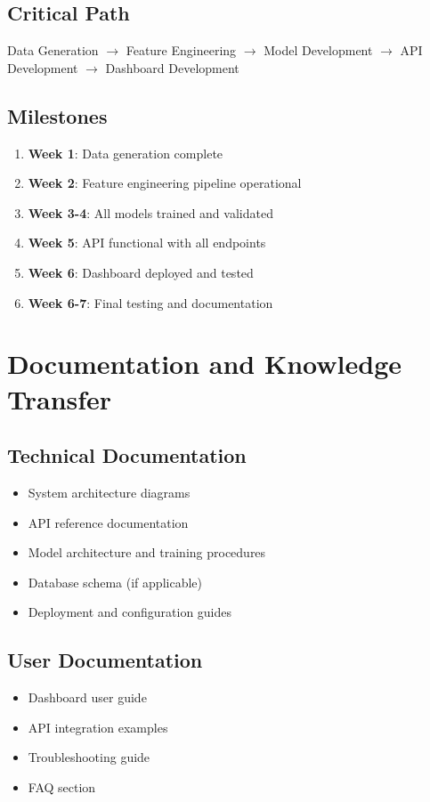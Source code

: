 \documentclass[12pt,a4paper]{article}
\begin{document}
\subsection{Critical Path}
Data Generation $\rightarrow$ Feature Engineering $\rightarrow$ Model Development $\rightarrow$ API Development $\rightarrow$ Dashboard Development

\subsection{Milestones}
\begin{enumerate}
    \item \textbf{Week 1}: Data generation complete
    \item \textbf{Week 2}: Feature engineering pipeline operational
    \item \textbf{Week 3-4}: All models trained and validated
    \item \textbf{Week 5}: API functional with all endpoints
    \item \textbf{Week 6}: Dashboard deployed and tested
    \item \textbf{Week 6-7}: Final testing and documentation
\end{enumerate}

\newpage

\section{Documentation and Knowledge Transfer}

\subsection{Technical Documentation}
\begin{itemize}[leftmargin=*]
    \item System architecture diagrams
    \item API reference documentation
    \item Model architecture and training procedures
    \item Database schema (if applicable)
    \item Deployment and configuration guides
\end{itemize}

\subsection{User Documentation}
\begin{itemize}[leftmargin=*]
    \item Dashboard user guide
    \item API integration examples
    \item Troubleshooting guide
    \item FAQ section
\end{itemize}
\end{document}
